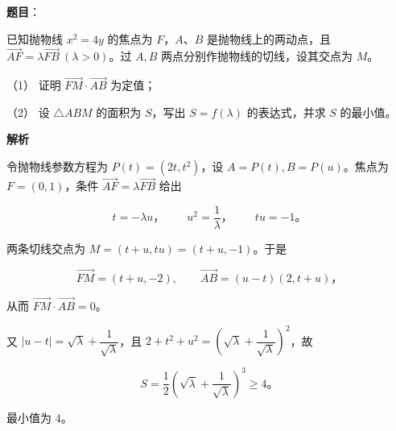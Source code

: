 \begin{answer}

\textbf{题目}：

已知抛物线 $x^2=4y$ 的焦点为 $F$，$A\text{、}B$ 是抛物线上的两动点，且 $\overrightarrow{AF}=\lambda\overrightarrow{FB}\ (\lambda>0)$。过 $A,B$ 两点分别作抛物线的切线，设其交点为 $M$。
\nopagebreak[4]
\begin{center}\end{center}
\nopagebreak[4]
（1） 证明 $\overrightarrow{FM}\cdot\overrightarrow{AB}$ 为定值；

（2） 设 $\triangle ABM$ 的面积为 $S$，写出 $S=f(\lambda)$ 的表达式，并求 $S$ 的最小值。

\textbf{解析}


令抛物线参数方程为 $P(t)=(2t,t^2)$，设 $A=P(t),B=P(u)$。焦点为 $F=(0,1)$，条件 $\overrightarrow{AF}=\lambda\overrightarrow{FB}$ 给出

\nopagebreak[4]
\[
t=-\lambda u\text{，}\qquad u^2=\frac1\lambda\text{，}\qquad tu=-1\text{。}
\]

两条切线交点为 $M=(t+u,tu)=(t+u,-1)$。于是

\nopagebreak[4]
\[
\overrightarrow{FM}=(t+u,-2),\qquad
\overrightarrow{AB}=(u-t)(2,t+u)\text{，}
\]

从而 $\overrightarrow{FM}\cdot\overrightarrow{AB}=0$。


又 $|u-t|=\sqrt\lambda+\dfrac1{\sqrt\lambda}$，且 $2+t^2+u^2=\left(\sqrt\lambda+\dfrac1{\sqrt\lambda}\right)^2$，故

\nopagebreak[4]
\[
S=\frac12\left(\sqrt\lambda+\frac1{\sqrt\lambda}\right)^3\geqslant4\text{。}
\]

最小值为 $4$。



\end{answer}
